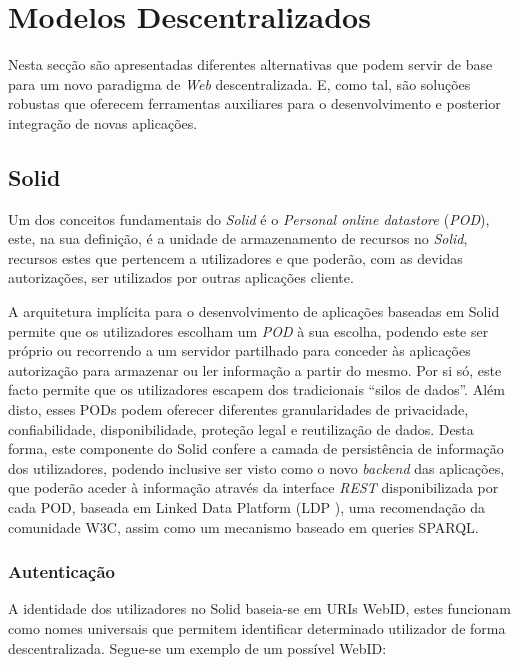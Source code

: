 \section{Modelos Descentralizados \label{section_modelos_descentralizados}}
Nesta secção são apresentadas diferentes alternativas que podem servir de base para um novo paradigma de \emph{Web} descentralizada. E, como tal, são soluções robustas que oferecem ferramentas auxiliares para o desenvolvimento e posterior integração de novas aplicações.

\subsection{Solid \label{estado_arte_solid}}
Um dos conceitos fundamentais do \emph{Solid} é o \emph{Personal online datastore \label{sym:POD}} (\emph{POD}), este, na sua definição, é a unidade de armazenamento de recursos no \emph{Solid}, recursos estes que pertencem a utilizadores e que poderão, com as devidas autorizações, ser utilizados por outras aplicações cliente.

A arquitetura implícita para o desenvolvimento de aplicações baseadas em Solid permite que os utilizadores escolham um \emph{POD} à sua escolha, podendo este ser próprio ou recorrendo a um servidor partilhado para conceder às aplicações autorização para armazenar ou ler informação a partir do mesmo. Por si só, este facto permite que os utilizadores escapem dos tradicionais “silos de dados”. Além disto, esses PODs podem oferecer diferentes granularidades de privacidade, confiabilidade, disponibilidade, proteção legal e reutilização de dados\cite{solid_official}. Desta forma, este componente do Solid confere a camada de persistência de informação dos utilizadores, podendo inclusive ser visto como o novo \emph{backend} das aplicações, que poderão aceder à informação através da interface \emph{REST}\cite{rest_foundations} disponibilizada por cada POD, baseada em Linked Data Platform (LDP \label{sym:LDP}), uma recomendação da comunidade W3C, assim como um mecanismo baseado em queries SPARQL\cite{solid_spec}.

\subsubsection{Autenticação \label{section_estado_arte_solid_authentication}}
A identidade dos utilizadores no Solid baseia-se em URIs WebID, estes funcionam como nomes universais que permitem identificar determinado utilizador de forma descentralizada. Segue-se um exemplo de um possível WebID:

